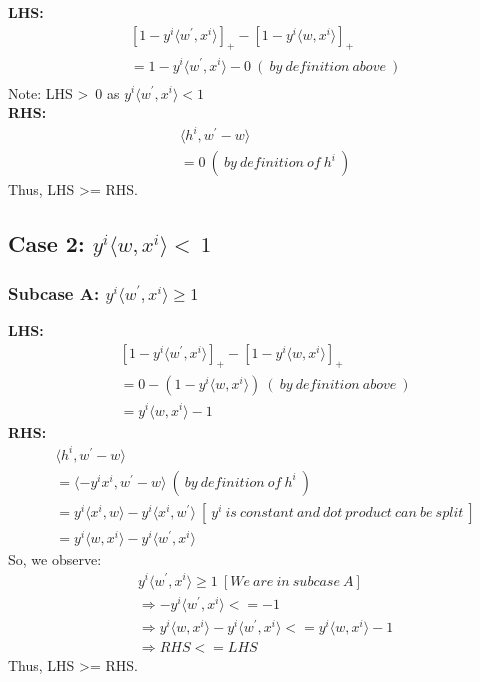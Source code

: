 \documentclass[a4paper,11pt]{article}
\begin{document}
\begin{mlsolution}
\textbf{LHS:} 
\begin{align}
    &[1-y^{i}\langle w^{'},x^i \rangle ]_{+} - [1-y^{i}\langle w,x^i \rangle ]_{+} \\
    &= 1-y^{i}\langle w^{'},x^i \rangle - 0 \ ( \ by \ definition \ above \ ) \\
\end{align}
Note: LHS \textgreater \ 0 as $y^{i}\langle w^{'},x^i \rangle < 1$\\
\textbf{RHS:}
\begin{align}
     &\langle h^i, w^{'} - w \rangle\\
    &= 0  \ ( \ by \ definition \ of \ h^i \ )
\end{align}
Thus, LHS \textgreater  = RHS.

\subsection*{Case 2: $y^{i}\langle w,x^i \rangle < \  1$}
\subsubsection*{Subcase A: $y^{i}\langle w^{'},x^i \rangle \geq 1$}

\textbf{LHS:} 
\begin{align}
    &[1-y^{i}\langle w^{'},x^i \rangle ]_{+} - [1-y^{i}\langle w,x^i \rangle ]_{+} \\
    &= 0 - (1-y^{i}\langle w,x^i \rangle) \ ( \ by \ definition \ above \ ) \\
    &= y^{i}\langle w,x^i \rangle - 1
\end{align}
\textbf{RHS:}
\begin{align}
     &\langle h^i, w^{'} - w \rangle\\
    &= \langle -y^ix^i, w^{'} - w \rangle  \ ( \ by \ definition \ of \ h^i \ )\\
    &= y^{i}\langle x^i,w \rangle - y^{i}\langle x^i,w^{'} \rangle \ [ \ y^i \ is \ constant \ and \ dot \ product \ can \ be \ split \ ] \\
    &= y^{i}\langle w,x^i \rangle - y^{i}\langle w^{'},x^i \rangle
\end{align}
So, we observe: \\
\begin{align}
    &y^{i}\langle w^{'},x^i \rangle \geq 1 \ [We \ are \ in \ subcase \ A]\\
    &\Rightarrow -y^{i}\langle w^{'},x^i \rangle <=  -1\\
    &\Rightarrow  y^{i}\langle w,x^i \rangle - y^{i}\langle w^{'},x^i \rangle <= y^{i}\langle w,x^i \rangle - 1\\
    &\Rightarrow RHS <= LHS
\end{align}
Thus, LHS \textgreater =  RHS.


\end{mlsolution}
\end{document}
